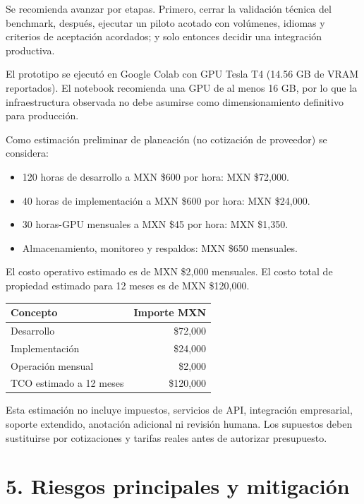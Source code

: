 \documentclass[letterpaper,11pt]{article}
\begin{document}
Se recomienda avanzar por etapas. Primero, cerrar la
validación técnica del benchmark, después, ejecutar un
piloto acotado con volúmenes, idiomas y criterios de
aceptación acordados; y solo entonces decidir una
integración productiva.

El prototipo se ejecutó en Google Colab con GPU Tesla T4
(14.56 GB de VRAM reportados). El notebook recomienda
una GPU de al menos 16 GB, por lo que la infraestructura
observada no debe asumirse como dimensionamiento definitivo
para producción.

Como estimación preliminar de planeación (no cotización
de proveedor) se considera:

\begin{itemize}[leftmargin=*,itemsep=2pt]
    \item 120 horas de desarrollo a MXN \$600 por hora:
    MXN \$72,000.
    \item 40 horas de implementación a MXN \$600 por hora:
    MXN \$24,000.
    \item 30 horas-GPU mensuales a MXN \$45 por hora:
    MXN \$1,350.
    \item Almacenamiento, monitoreo y respaldos:
    MXN \$650 mensuales.
\end{itemize}

El costo operativo estimado es de MXN \$2,000 mensuales.
El costo total de propiedad estimado para 12 meses es
de MXN \$120,000.

\vspace{0.2cm}

\begin{center}
\begin{tabular}{lr}
\toprule
\textbf{Concepto} & \textbf{Importe MXN}\\
\midrule
Desarrollo & \$72,000\\
Implementación & \$24,000\\
Operación mensual & \$2,000\\
TCO estimado a 12 meses & \$120,000\\
\bottomrule
\end{tabular}
\end{center}

Esta estimación no incluye impuestos, servicios de API,
integración empresarial, soporte extendido, anotación
adicional ni revisión humana. Los supuestos deben
sustituirse por cotizaciones y tarifas reales antes
de autorizar presupuesto.

\section*{\color{azul}5. Riesgos principales y mitigación}
\end{document}

